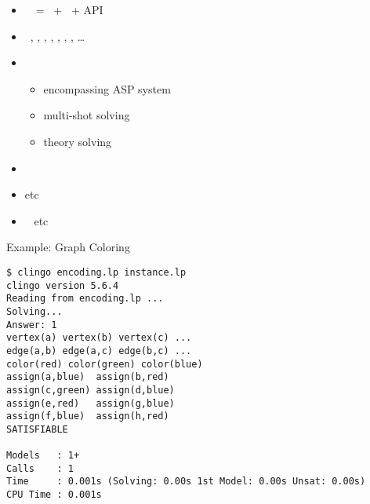 \begin{frame}{\clingo}
  \begin{itemize}
  \item {} \ \clingo\ = \gringo\ + \clasp\ + API
  \item {} \
    \C,
    \cpp,
    \java,
    \lua,
    \prolog,
    \python,
    \rust,
    \dots
  \item {} \
    \begin{itemize}
    \item encompassing ASP system
    \item multi-shot solving
    \item theory solving
    \end{itemize}
  \item {} \ \cite{gekakasc17a,jakaosscscwa17a,karoscwa21a}
  \item {} \par
    \cite{liutru13a,gamarowawo15a,erdher20a,erfimapr20a,bojawe19a,schwitter12a,dabmar20a,ngstsoye20a,smanmapo12a,cosmma12a,dikophps20a,wotawa20a,bogerd20a,aisaam18a,becadolemamava21a,izmerd20a} etc
  \item \structure{Systems} \
    \cite{cafamu20a,bablee13a,scbhsuwa18a,tepfri18a,dvrawawo20a,bainkaokscsotawa18a,reraigpajh19a,eikarescwe17a} etc
  \end{itemize}
\end{frame}

\begin{frame}[fragile]{Example: Graph Coloring}
\begin{adjustbox}{max totalsize={\textwidth}{.83\textheight},keepaspectratio}
\begin{lstlisting}
$ clingo encoding.lp instance.lp
clingo version 5.6.4
Reading from encoding.lp ...
Solving...
Answer: 1
vertex(a) vertex(b) vertex(c) ...
edge(a,b) edge(a,c) edge(b,c) ...
color(red) color(green) color(blue)
assign(a,blue)  assign(b,red)
assign(c,green) assign(d,blue)
assign(e,red)   assign(g,blue)
assign(f,blue)  assign(h,red)
SATISFIABLE

Models   : 1+
Calls    : 1
Time     : 0.001s (Solving: 0.00s 1st Model: 0.00s Unsat: 0.00s)
CPU Time : 0.001s
\end{lstlisting}%
\end{adjustbox}
\end{frame}

